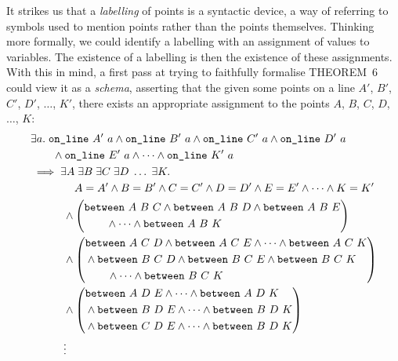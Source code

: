It strikes us that a \emph{labelling} of points is a syntactic device, a way of referring to symbols used to mention points rather than the points themselves. Thinking more formally, we could identify a labelling with an assignment of values to variables. The existence of a labelling is then the existence of these assignments. With this in mind, a first pass at trying to faithfully formalise THEOREM~6 could view it as a \emph{schema}, asserting that the given some points on a line $A'$, $B'$, $C'$, $D'$, $\ldots$, $K'$, there exists an appropriate assignment to the points $A$, $B$, $C$, $D$, $\ldots$, $K$:
\begin{equation*}
  \begin{split}
    &\exists a.\;\code{on\_line}\ A'\ a\wedge\code{on\_line}\ B'\ a\wedge\code{on\_line}\ C'\ a\wedge\code{on\_line}\ D'\ a\\
    &\qquad\wedge\code{on\_line}\ E'\ a\wedge\cdots\wedge\code{on\_line}\ K'\ a\\
    &\implies\exists A\;\exists B\;\exists C\;\exists D\; \ldots\;\exists K.\; \\
    &\qquad\qquad A = A' \wedge B = B' \wedge C = C' \wedge D = D' \wedge E = E' \wedge \cdots \wedge K = K'\\
    &\qquad\quad\wedge\left(\begin{split}&\between{A}{B}{C} \wedge \between{A}{B}{D} \wedge \between{A}{B}{E} \\ &\qquad\wedge\cdots \wedge \between{A}{B}{K}\end{split}\right) \\
    &\qquad\quad\wedge
    \left(\begin{split}&\between{A}{C}{D} \wedge \between{A}{C}{E} \wedge \cdots \wedge \between{A}{C}{K}\\
        &\wedge\between{B}{C}{D} \wedge \between{B}{C}{E} \wedge \between{B}{C}{K}\\
        &\qquad\wedge \cdots \wedge \between{B}{C}{K}
      \end{split}\right)\\  
    &\qquad\quad\wedge
    \left(\begin{split}&\between{A}{D}{E} \wedge \cdots \wedge \between{A}{D}{K} \\
        &\wedge\between{B}{D}{E} \wedge \cdots \wedge \between{B}{D}{K} \\
        &\wedge\between{C}{D}{E} \wedge \cdots \wedge \between{B}{D}{K}
        \end{split}\right)\\
    &\qquad\quad\vdots
  \end{split}
\end{equation*}


